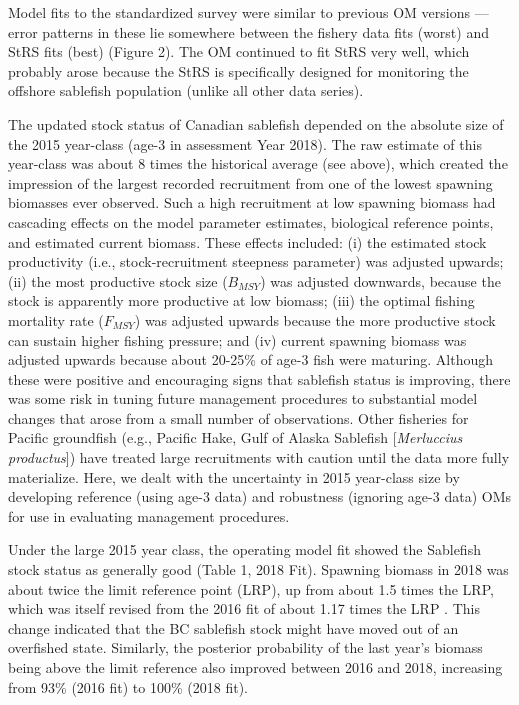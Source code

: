 \documentclass[11pt]{book}
\begin{document}
Model fits to the standardized survey were similar to previous OM versions --- error patterns in these lie somewhere between the fishery data fits (worst) and StRS fits (best) (Figure 2). The OM continued to fit StRS very well, which probably arose because the StRS is specifically designed for monitoring the offshore sablefish population (unlike all other data series).

The updated stock status of Canadian sablefish depended on the absolute size of the 2015 year-class (age-3 in assessment Year 2018). The raw estimate of this year-class was about 8 times the historical average (see above), which created the impression of the largest recorded recruitment from one of the lowest spawning biomasses ever observed. Such a high recruitment at low spawning biomass had cascading effects on the model parameter estimates, biological reference points, and estimated current biomass. These effects included: (i) the estimated stock productivity (i.e., stock-recruitment steepness parameter) was adjusted upwards; (ii) the most productive stock size (\(B_{MSY}\)) was adjusted downwards, because the stock is apparently more productive at low biomass; (iii) the optimal fishing mortality rate (\(F_{MSY}\)) was adjusted upwards because the more productive stock can sustain higher fishing pressure; and (iv) current spawning biomass was adjusted upwards because about 20-25\% of age-3 fish were maturing. Although these were positive and encouraging signs that sablefish status is improving, there was some risk in tuning future management procedures to substantial model changes that arose from a small number of observations. Other fisheries for Pacific groundfish (e.g., Pacific Hake, Gulf of Alaska Sablefish {[}\emph{Merluccius productus}{]}) have treated large recruitments with caution until the data more fully materialize. Here, we dealt with the uncertainty in 2015 year-class size by developing reference (using age-3 data) and robustness (ignoring age-3 data) OMs for use in evaluating management procedures.

Under the large 2015 year class, the operating model fit showed the Sablefish stock status as generally good (Table 1, 2018 Fit). Spawning biomass in 2018 was about twice the limit reference point (LRP), up from about 1.5 times the LRP, which was itself revised from the 2016 fit of about 1.17 times the LRP . This change indicated that the BC sablefish stock might have moved out of an overfished state. Similarly, the posterior probability of the last year's biomass being above the limit reference also improved between 2016 and 2018, increasing from 93\% (2016 fit) to 100\% (2018 fit).
\end{document}
